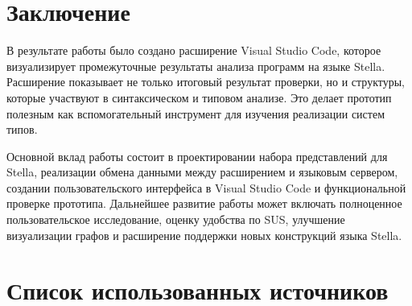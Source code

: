 ﻿\documentclass[14pt,a4paper]{extarticle}
\begin{document}
\section*{Заключение}

В результате работы было создано расширение Visual Studio Code, которое визуализирует промежуточные результаты анализа программ на языке Stella. Расширение показывает не только итоговый результат проверки, но и структуры, которые участвуют в синтаксическом и типовом анализе. Это делает прототип полезным как вспомогательный инструмент для изучения реализации систем типов.

Основной вклад работы состоит в проектировании набора представлений для Stella, реализации обмена данными между расширением и языковым сервером, создании пользовательского интерфейса в Visual Studio Code и функциональной проверке прототипа. Дальнейшее развитие работы может включать полноценное пользовательское исследование, оценку удобства по SUS, улучшение визуализации графов и расширение поддержки новых конструкций языка Stella.
\section*{Список использованных источников}
\end{document}
